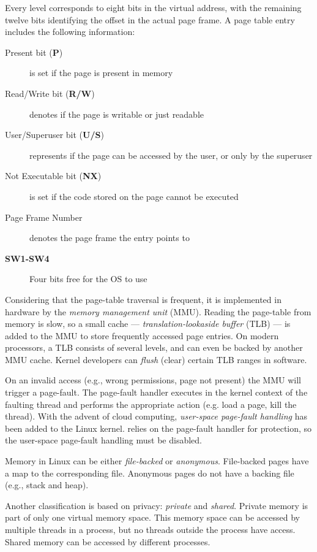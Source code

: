 Every level corresponds to eight bits in the virtual address, with the remaining twelve
bits identifying the offset in the actual page frame. A page table entry
includes the following information:
\begin{description}
    \item[Present bit (\textbf{P})] is set if the page is present in memory
    \item[Read/Write bit (\textbf{R/W})] denotes if the page is writable or just
         readable
    \item[User/Superuser bit (\textbf{U/S})] represents if the page can be 
    accessed by the user, or only by the superuser
    \item[Not Executable bit (\textbf{NX})] is set if the code stored on the 
    page cannot be executed
    \item[Page Frame Number] denotes the page frame the entry points to
    \item[\textbf{SW1-SW4}] Four bits free for the OS to use
\end{description}

Considering that the page-table traversal is frequent, it is implemented in
hardware by the \emph{memory management unit} (MMU). Reading the page-table from
memory is slow, so a small cache --- \emph{translation-lookaside buffer} (TLB)
--- is added to the MMU to store frequently accessed page entries. On modern
processors, a TLB consists of several levels, and can even be backed by another
MMU cache. Kernel developers can \emph{flush} (clear) certain TLB ranges in
software.

On an invalid access (e.g., wrong permissions, page not present) the MMU will
trigger a page-fault. The page-fault handler executes in the kernel context of
the faulting thread and performs the appropriate action (e.g. load a page, kill
the thread). With the advent of cloud computing, \emph{user-space page-fault
handling} has been added to the Linux kernel. \sysname relies on the page-fault
handler for protection, so the user-space page-fault handling must be disabled.

Memory in Linux can be either \emph{file-backed} or \emph{anonymous}.
File-backed pages have a map to the corresponding file. Anonymous pages do not
have a backing file (e.g., stack and heap).

Another classification is based on privacy: \emph{private} and \emph{shared}. 
Private memory is part of only one virtual memory space. This memory space can 
be accessed by multiple threads in a process, but no threads outside the process
have access. Shared memory can be accessed by different processes.

